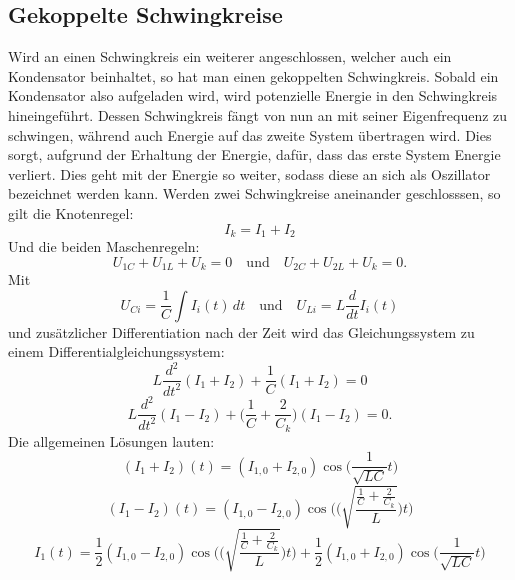 
\subsection{Gekoppelte Schwingkreise}

Wird an einen Schwingkreis ein weiterer angeschlossen, welcher auch ein Kondensator beinhaltet, so hat man einen gekoppelten Schwingkreis. Sobald ein Kondensator also aufgeladen wird, wird potenzielle Energie in den Schwingkreis hineingeführt. Dessen Schwingkreis fängt von nun an mit seiner Eigenfrequenz zu schwingen, während auch Energie auf das zweite System übertragen wird. Dies sorgt, aufgrund der Erhaltung der Energie, dafür, dass das erste System Energie verliert.
Dies geht mit der Energie so weiter, sodass diese an sich als Oszillator bezeichnet werden kann.
Werden zwei Schwingkreise aneinander geschlosssen, so gilt die Knotenregel:
\begin{equation}
    I_k = I_1 + I_2
\end{equation}
Und die beiden Maschenregeln:
\begin{equation}
    U_{1C} + U_{1L} + U_k = 0
    \quad\textrm{und}\quad
    U_{2C} + U_{2L} + U_k = 0.
\end{equation} 
Mit
\begin{equation}
    U_{Ci} = \frac{1}{C} \int I_i(t) \,{d}t
    \quad\textrm{und}\quad
    U_{Li} = L \frac{d}{dt} I_i(t)
\end{equation}
und zusätzlicher Differentiation nach der Zeit wird das Gleichungssystem zu einem Differentialgleichungssystem:
\begin{equation}
L \frac{d^2}{dt^2} (I_1 + I_2) + \frac{1}{C}(I_1+I_2) = 0
\end{equation}
\begin{equation}
L \frac{d^2}{dt^2} (I_1 - I_2) + \Biggl(\frac{1}{C} + \frac{2}{C_k} \Biggr)(I_1 - I_2) = 0.
\end{equation}
Die allgemeinen Lösungen lauten:
\begin{equation}
    (I_1+I_2)(t) = (I_{1,0} + I_{2,0}) \cos\Biggl(\frac{1}{\sqrt{LC}}t\Biggr)
\end{equation}
\begin{equation}
    (I_1-I_2)(t) = (I_{1,0} - I_{2,0}) \cos\Biggl(\Biggl(\sqrt{\frac{\frac{1}{C}+\frac{2}{C_k}}{L}}\Biggr)t\Biggr)
\end{equation}
\begin{equation}
    I_1(t) = \frac{1}{2}(I_{1,0}-I_{2,0})\cos\Biggl(\Biggl(\sqrt{\frac{\frac{1}{C}+\frac{2}{C_k}}{L}}\Biggr)t\Biggr)+\frac{1}{2}(I_{1,0}+I_{2,0})\cos\Biggl(\frac{1}{\sqrt{LC}}t\Biggr)
\end{equation}
